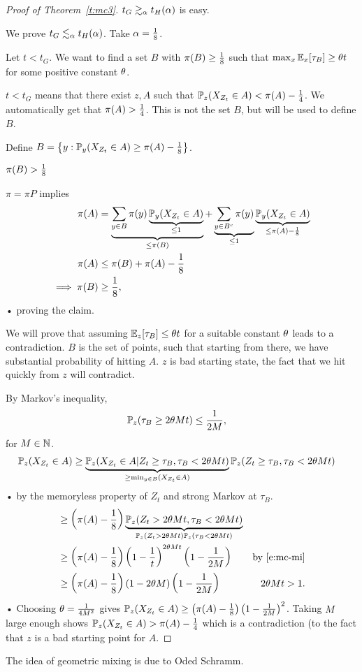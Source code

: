 \begin{proof}[Proof of Theorem~\ref{t:mc3}]
$t_G\gtrsim_\alpha t_H(\alpha)$ is easy. 

We prove $t_G\lesssim_\alpha t_H(\alpha)$. Take $\alpha=\frac{1}{8}$.

Let $t<t_G$.
We want to find a set $B$  with $\pi(B)\ge \frac{1}{8}$ such that $\max_x\mathbb{E}_x[\tau_B]\ge \theta t$ for some positive constant $\theta$. 

$t<t_G$ means that there exist $z,A$ such that $\mathbb{P}_z(X_{Z_t}\in A)< \pi(A)-\frac{1}{4}$.
We automatically get that $\pi(A)>\frac{1}{4}$. This is not the set $B$, but will be used to define $B$.

Define $B=\left\{{y}:{\mathbb{P}_y(X_{Z_t}\in A)\ge \pi(A)-\frac{1}{8}}\right\}$. 
\begin{clm*}
$\pi(B)>\frac{1}{8}$
\end{clm*}
$\pi = \pi P$ implies
\begin{align*}
\pi(A) &= \underbrace{\sum_{y\in B} \pi(y) \underbrace{\mathbb{P}_y(X_{Z_t}\in A)}_{\le 1}}_{\le \pi(B)} + \underbrace{\sum_{y\in B^c} \pi(y)}_{\le1} \underbrace{\mathbb{P}_y(X_{Z_t}\in A)}_{\le \pi(A)-\frac{1}{8}}\\
\pi(A) &\le \pi(B) + \pi(A)-\frac{1}{8} \\
\implies 
\pi(B) &\ge \frac{1}{8},
\end{align*}•
proving the claim.

We will prove that assuming $\mathbb{E}_z[\tau_B]\le \theta t$ for a suitable constant $\theta$ leads to a contradiction.
$B$ is the set of points, such that starting from there, we have substantial probability of hitting $A$. $z$ is bad starting state, the fact that we hit quickly from $z$ will contradict.

By Markov's inequality, 
\begin{align}\label{e:mc-mi}\mathbb{P}_z(\tau_B \ge 2\theta Mt) &\le \frac{1}{2M},
\end{align}
for $M\in \mathbb{N}$.
\begin{align*}
\mathbb{P}_z(X_{Z_t}\in A) 
&\ge \underbrace{\mathbb{P}_z(X_{Z_t}\in A| Z_t\ge \tau_B,\tau_B<2\theta Mt)}_{\ge \min_{y\in B} (X_{Z_t}\in A)}
\mathbb{P}_z(Z_t\ge \tau_B, \tau_B <2\theta Mt)
\end{align*}•
by the memoryless property of $Z_t$ and strong Markov at $\tau_B$.
\begin{align*}
&\ge \left( {\pi(A) - \frac{1}{8}} \right) \underbrace{\mathbb{P}_z(Z_t>2\theta Mt, \tau_B<2\theta Mt)}_{\mathbb{P}_z(Z_t>2\theta Mt) \mathbb{P}_z(\tau_B<2\theta Mt)}\\
&\ge \left( {\pi(A)-\frac{1}{8}} \right) \left( {1-\frac{1}{t}} \right)^{2\theta M t}\left( {1-\frac{1}{2M}} \right)&\text{by~\eqref{e:mc-mi}}\\
&\ge \left( {\pi(A) - \frac{1}{8}} \right)\left( {1-2\theta M} \right) \left( {1-\frac{1}{2M}} \right)&2\theta Mt>1.
\end{align*}•
Choosing $\theta = \frac{1}{4M^2}$ gives $\mathbb{P}_z(X_{Z_t}\in A)\ge \left( {\pi(A)-\frac{1}{8}} \right) \left( {1-\frac{1}{2M}} \right)^2$. 
Taking $M$ large enough shows $\mathbb{P}_z(X_{Z_t}\in A)>\pi(A)-\frac{1}{4}$ which is a contradiction (to the fact that $z$ is a bad starting point for $A$.
\end{proof}
The idea of geometric mixing is due to Oded Schramm.

